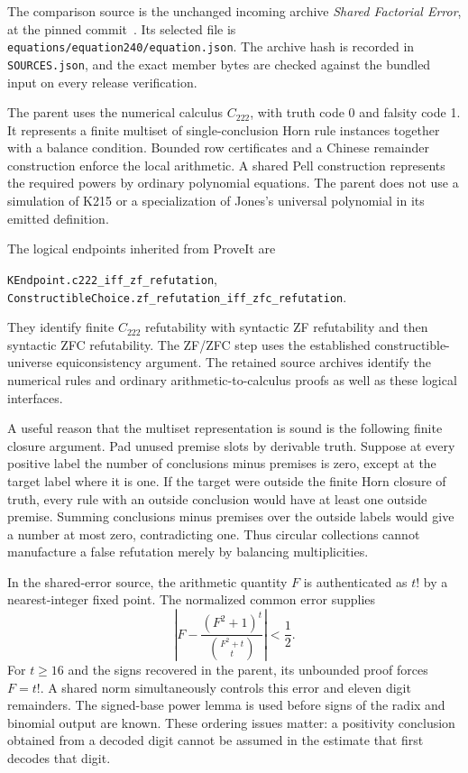 \documentclass[10pt,letterpaper]{article}
\theoremstyle{definition}\newtheorem{remark}[theorem]{Remark}
\begin{document}
The comparison source is the unchanged incoming archive
\emph{Shared Factorial Error}, at the pinned commit~\cite{shared,repo}.
Its selected file is
\nolinkurl{equations/equation240/equation.json}. The archive hash is
recorded in \nolinkurl{SOURCES.json}, and the exact member bytes are checked
against the bundled input on every release verification.

The parent uses the numerical calculus $C_{222}$, with truth code 0 and
falsity code 1. It represents a finite multiset of single-conclusion Horn
rule instances together with a balance condition. Bounded row certificates
and a Chinese remainder construction enforce the local arithmetic. A
shared Pell construction represents the required powers by ordinary
polynomial equations. The parent does not use a simulation of K215 or a
specialization of Jones's universal polynomial in its emitted definition.

The logical endpoints inherited from ProveIt are
\begin{center}\small
\nolinkurl{KEndpoint.c222_iff_zf_refutation},\\
\nolinkurl{ConstructibleChoice.zf_refutation_iff_zfc_refutation}.
\end{center}
They identify finite $C_{222}$ refutability with syntactic ZF refutability
and then syntactic ZFC refutability. The ZF/ZFC step uses the established
constructible-universe equiconsistency argument. The retained source
archives identify the numerical rules and ordinary arithmetic-to-calculus
proofs as well as these logical interfaces.

A useful reason that the multiset representation is sound is the following
finite closure argument. Pad unused premise slots by derivable truth.
Suppose at every positive label the number of conclusions minus premises
is zero, except at the target label where it is one. If the target were
outside the finite Horn closure of truth, every rule with an outside
conclusion would have at least one outside premise. Summing conclusions
minus premises over the outside labels would give a number at most zero,
contradicting one. Thus circular collections cannot manufacture a false
refutation merely by balancing multiplicities.

In the shared-error source, the arithmetic quantity $F$ is authenticated as
$t!$ by a nearest-integer fixed point. The normalized common error supplies
\[
 \left|F-\frac{(F^2+1)^t}{\binom{F^2+t}{t}}\right|<\frac12.
\]
For $t\ge16$ and the signs recovered in the parent, its unbounded proof
forces $F=t!$. A shared norm simultaneously controls this error and eleven
digit remainders. The signed-base power lemma is used before signs of the
radix and binomial output are known. These ordering issues matter: a
positivity conclusion obtained from a decoded digit cannot be assumed in
the estimate that first decodes that digit.
\end{document}
